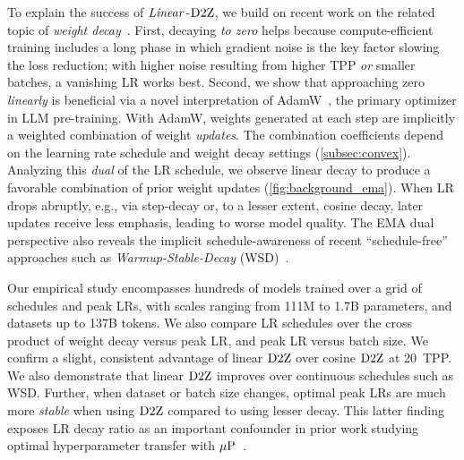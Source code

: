 

To explain the success of $\mbox{\emph{Linear}}$-$\mbox{D2Z}$, we build on recent work
on the related topic of \emph{weight
decay}~\citep{andriushchenko2023why,wang2024how}.
%
First, decaying \emph{to zero} helps because compute-efficient
training includes a long phase in which gradient noise is the key
factor slowing the loss reduction; with higher noise resulting from
higher TPP \emph{or} smaller batches, a vanishing LR works best.
Second, we show that approaching zero \emph{linearly} is beneficial
via a novel interpretation of AdamW~\citep{loshchilov2017decoupled},
the primary optimizer in LLM pre-training.
With AdamW, weights generated at each step are implicitly a weighted
combination of weight \emph{updates}.  The combination coefficients
depend on the learning rate schedule and weight decay settings
(\cref{subsec:convex}).
%
Analyzing this \emph{dual} of the LR schedule, we observe linear decay
to produce a favorable combination of prior weight updates
(\cref{fig:background_ema}).  When LR drops abruptly, e.g., via
step-decay or, to a lesser extent, cosine decay, later updates receive
less emphasis, leading to worse model quality.
%
The EMA dual perspective also reveals the implicit schedule-awareness
of recent ``schedule-free'' approaches such
as \emph{Warmup-Stable-Decay}
(WSD)~\citep{hu2024minicpm,bi2024deepseek,hagele2024scaling}.
%

Our empirical study encompasses hundreds of models trained over a grid
of schedules and peak LRs, with scales ranging from 111M to 1.7B
parameters, and datasets up to 137B tokens.  We also compare LR
schedules over the cross product of weight decay versus peak LR, and
peak LR versus batch size.
%
We confirm a slight, consistent advantage of linear $\mbox{D2Z}$ over
cosine $\mbox{D2Z}$ at 20~TPP\@.  We also demonstrate that linear $\mbox{D2Z}$
improves over continuous schedules such as WSD\@.
%
Further, when dataset or batch size changes, optimal peak LRs are much
more \emph{stable} when using $\mbox{D2Z}$ compared to using lesser decay.
This latter finding exposes LR decay ratio as an important confounder
in prior work studying optimal hyperparameter transfer with
$\mbox{$\mu$P}$~\citep{yang2020feature,yang2022mup}.
